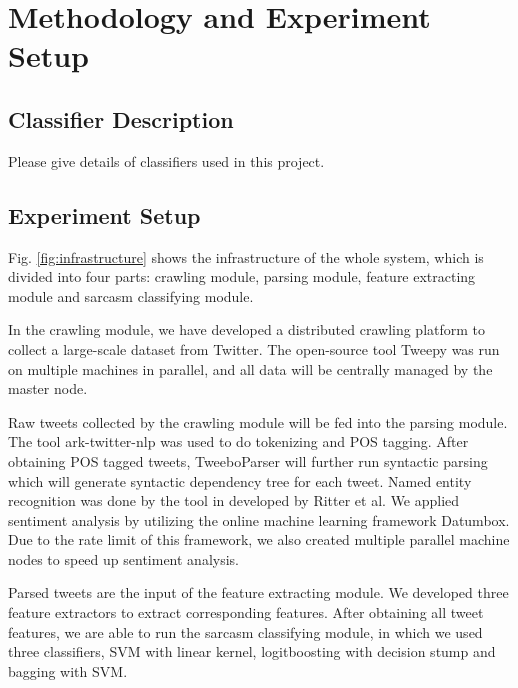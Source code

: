 \section{Methodology and Experiment Setup}
\label{sec:methodology}
\subsection{Classifier Description}
Please give details of classifiers used in this project.

\subsection{Experiment Setup}

Fig. \ref{fig:infrastructure} shows the infrastructure of the whole system, which is divided into four parts: crawling module, parsing module, feature extracting module and sarcasm classifying module.

In the crawling module, we have developed a distributed crawling platform to collect a large-scale dataset from Twitter. The open-source tool Tweepy\cite{tweepy} was run on multiple machines in parallel, and all data will be centrally managed by the master node.

Raw tweets collected by the crawling module will be fed into the parsing module. The tool ark-twitter-nlp\cite{tweetnlp} was used to do tokenizing and POS tagging. After obtaining POS tagged tweets, TweeboParser\cite{kong2014dependency} will further run syntactic parsing which will generate syntactic dependency tree for each tweet. Named entity recognition was done by the tool in developed by Ritter et al\cite{Ritter11}\cite{Ritter12}. We applied sentiment analysis by utilizing the online machine learning framework Datumbox\cite{datumbox}. Due to the rate limit of this framework, we also created multiple parallel machine nodes to speed up sentiment analysis.

Parsed tweets are the input of the feature extracting module. We developed three feature extractors to extract corresponding features. After obtaining all tweet features, we are able to run the sarcasm classifying module, in which we used three classifiers, SVM with linear kernel, logitboosting with decision stump and bagging with SVM. 

